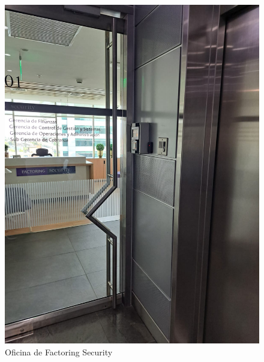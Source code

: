 \documentclass[12pt,a4paper]{report}
\begin{document}
\begin{itemize}
    \begin{figure}[H]
      \centering
      \includegraphics[width=14cm]{images/fotografias/oficina-2.jpeg}
      \caption{Oficina de Factoring Security}
    \end{figure}
    \begin{figure}[H]
      \centering

\end{figure}
\end{itemize}
\end{document}
